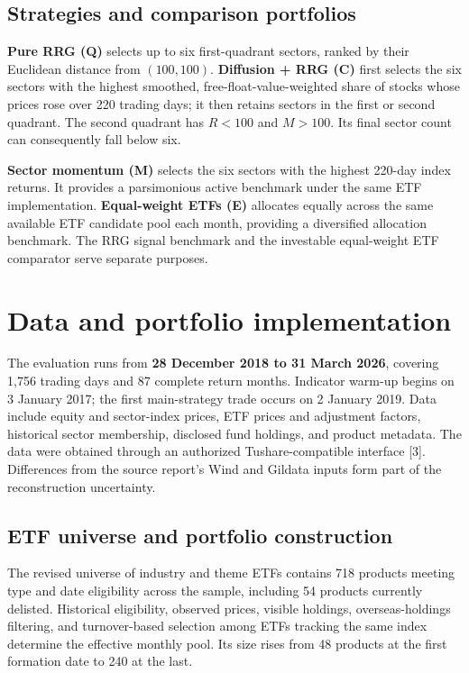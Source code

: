 \subsection{Strategies and comparison portfolios}
\textbf{Pure RRG (Q)} selects up to six first-quadrant sectors, ranked by their Euclidean distance from $(100,100)$. \textbf{Diffusion + RRG (C)} first selects the six sectors with the highest smoothed, free-float-value-weighted share of stocks whose prices rose over 220 trading days; it then retains sectors in the first or second quadrant. The second quadrant has $R<100$ and $M>100$. Its final sector count can consequently fall below six.

\textbf{Sector momentum (M)} selects the six sectors with the highest 220-day index returns. It provides a parsimonious active benchmark under the same ETF implementation. \textbf{Equal-weight ETFs (E)} allocates equally across the same available ETF candidate pool each month, providing a diversified allocation benchmark. The RRG signal benchmark and the investable equal-weight ETF comparator serve separate purposes.

\newpage
\section{Data and portfolio implementation}
The evaluation runs from \textbf{28 December 2018 to 31 March 2026}, covering 1,756 trading days and 87 complete return months. Indicator warm-up begins on 3 January 2017; the first main-strategy trade occurs on 2 January 2019. Data include equity and sector-index prices, ETF prices and adjustment factors, historical sector membership, disclosed fund holdings, and product metadata. The data were obtained through an authorized Tushare-compatible interface [3]. Differences from the source report's Wind and Gildata inputs form part of the reconstruction uncertainty.

\subsection{ETF universe and portfolio construction}
The revised universe of industry and theme ETFs contains 718 products meeting type and date eligibility across the sample, including 54 products currently delisted. Historical eligibility, observed prices, visible holdings, overseas-holdings filtering, and turnover-based selection among ETFs tracking the same index determine the effective monthly pool. Its size rises from 48 products at the first formation date to 240 at the last.

